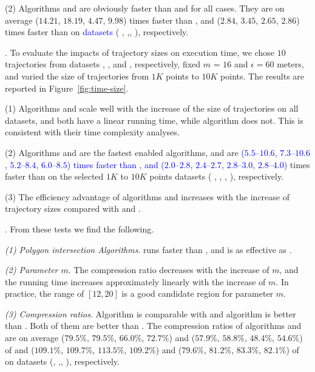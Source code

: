 \ni(2) Algorithms \cist and \cista are obviously faster than \dps and \squishe for all cases.
They are on average ($14.21$, $18.19$, $4.47$, $9.98$) times faster than \dps,
and ($2.84$, $3.45$, $2.65$, $2.86$) times faster than \squishe on
\textcolor{blue}{datasets} ( \sercar, {\geolife},\mopsi, \pricar), respectively.


.
To evaluate the impacts of trajectory sizes on execution time,
we chose {$10$} trajectories from {datasets}  \sercar, \geolife, \mopsi and \pricar, respectively,
fixed $m$ = $16$ and $\epsilon = 60$ meters, and varied the size  of trajectories from $1K$ points to $10K$ points.
%
The results are reported in Figure~\ref{fig:time-size}.

\ni(1) Algorithms \cist and \cista scale well with the increase of the size of trajectories on all datasets,
and both have a linear running time, while algorithm \dps does not.
This is consistent with their time complexity analyses.

\ni(2) Algorithms \cist and \cista are the fastest \sed enabled \lsa algorithms,
and are \textcolor{blue}{($5.5$--$10.6$, $7.3$--$10.6$, $5.2$--$8.4$, $6.0$--$8.5$) times faster than \dps,
and {($2.0$--$2.8$, $2.4$--$2.7$, $2.8$--$3.0$, $2.8$--$4.0$)}} times faster
than \squishe  on the selected $1K$ to $10K$ points datasets ( \sercar,
\geolife, \mopsi, \pricar), respectively.

\ni(3) The efficiency advantage of algorithms \cist and \cista increases with the increase of trajectory sizes compared with \dps and \squishe.



.
From these tests we find the following.

\sstab \emph{(1) Polygon intersection Algorithms}. \rpia runs faster than \cpia, and is as effective as \cpia.

\sstab\emph{(2) Parameter $m$}. The compression ratio decreases with the increase of $m$, and the running time increases approximately linearly with the increase of $m$. In practice, the range of $[12, 20]$ is a good candidate region for parameter $m$.

\sstab\emph{(3) Compression ratios}. Algorithm \cist is comparable with \dps and algorithm \cista is better than \dps.
Both of them are better than \squishe.
The compression ratios of algorithms \cist and \cista are on average ($79.5\%$,
$79.5\%$, $66.0\%$, $72.7\%$)
and ($57.9\%$, $58.8\%$, $48.4\%$, $54.6\%$) of \squishe
and ($109.1\%$, $109.7\%$, $113.5\%$, $109.2\%$) and
($79.6\%$, $81.2\%$, $83.3\%$, $82.1\%$) of \dps on {datasets} (\sercar, \geolife,\mopsi, \pricar), respectively.


